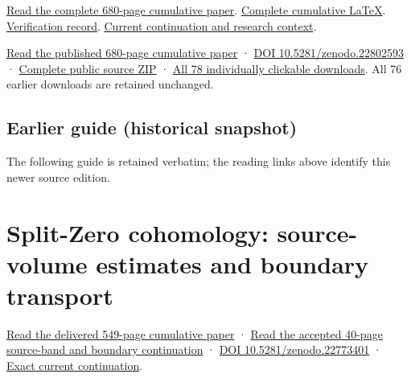 \documentclass[
]{article}
\begin{document}
\href{https://github.com/KokunoYumeto/zeta-function-research-reader/blob/main/workbenches/splitzero-tandem/continuations/20260916-arithmetic-source-and-flag-continuation/15_CURRENT_MIXED_CONTROL_READER.pdf}{Read
the complete 680-page cumulative paper}.
\href{https://github.com/KokunoYumeto/zeta-function-research-reader/blob/main/workbenches/splitzero-tandem/continuations/20260916-arithmetic-source-and-flag-continuation/14_CURRENT_KERNEL_AND_MULTIPLICITY_PROOFS.tex}{Complete
cumulative LaTeX}.
\href{https://github.com/KokunoYumeto/zeta-function-research-reader/blob/main/workbenches/splitzero-tandem/continuations/20260916-arithmetic-source-and-flag-continuation/12_VALIDATION.md}{Verification
record}.
\href{https://github.com/KokunoYumeto/zeta-function-research-reader/blob/main/workbenches/splitzero-tandem/continuations/20260916-arithmetic-source-and-flag-continuation/00_CONTINUE_HERE.md}{Current
continuation and research context}.

\href{https://zenodo.org/api/records/22802593/files/77-splitzero-source-transport-reader.pdf/content}{Read
the published 680-page cumulative paper} ·
\href{https://doi.org/10.5281/zenodo.22802593}{DOI
10.5281/zenodo.22802593} ·
\href{https://zenodo.org/api/records/22802593/files/78-splitzero-source-transport-sources.zip/content}{Complete
public source ZIP} ·
\href{https://github.com/KokunoYumeto/zeta-function-research-reader/blob/main/calculation_edition_20260916_arithmetic_source_and_flag/README.md}{All
78 individually clickable downloads}. All 76 earlier downloads are
retained unchanged.

\subsection{Earlier guide (historical
snapshot)}\label{earlier-guide-historical-snapshot-9}

The following guide is retained verbatim; the reading links above
identify this newer source edition.

\section{Split-Zero cohomology: source-volume estimates and boundary
transport}\label{split-zero-cohomology-source-volume-estimates-and-boundary-transport}

\href{https://zenodo.org/api/records/22773401/files/74-primitive-band-reader.pdf/content}{Read
the delivered 549-page cumulative paper} ·
\href{https://zenodo.org/api/records/22773401/files/75-primitive-band-supplement.pdf/content}{Read
the accepted 40-page source-band and boundary continuation} ·
\href{https://doi.org/10.5281/zenodo.22773401}{DOI
10.5281/zenodo.22773401} ·
\href{https://github.com/KokunoYumeto/zeta-function-research-reader/blob/02e47c28b98912d3ea1ec1bf01a3a5ba44197e9f/workbenches/splitzero-tandem/continuations/20260915-primitive-band-continuation/00_CONTINUE_HERE.md}{Exact
current continuation}.
\end{document}

